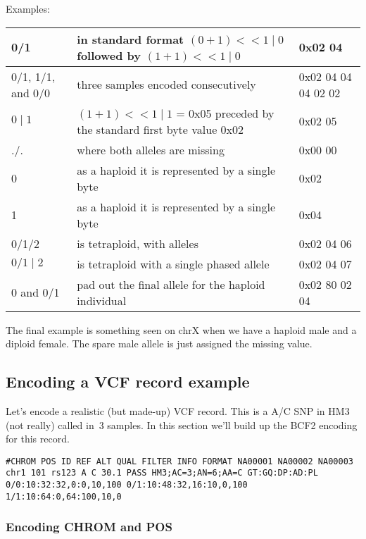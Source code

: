 \documentclass[8pt]{article}
\begin{document}
Examples:

\vspace{0.3cm}
\small
\begin{tabular}{|p{2.5cm} | p{10cm} | p{3cm}|} \hline
0/1 & in standard format $(0 + 1) << 1 \mid 0$ followed by $(1 + 1) << 1 \mid 0$ & 0x02 04 \\ \hline
0/1, 1/1, and 0/0 & three samples encoded consecutively & 0x02 04 04 04 02 02 \\ \hline
$0\mid1$ & $(1 + 1) << 1 \mid 1$ = 0x05 preceded by the standard first byte value 0x02 & 0x02 05 \\ \hline
./. & where both alleles are missing & 0x00 00 \\ \hline
0 & as a haploid it is represented by a single byte & 0x02 \\ \hline
1 & as a haploid it is represented by a single byte & 0x04 \\ \hline
0/1/2 & is tetraploid, with alleles & 0x02 04 06 \\ \hline
$0/1\mid2$ & is tetraploid with a single phased allele & 0x02 04 07 \\ \hline
0 and 0/1 & pad out the final allele for the haploid individual & 0x02 80 02 04\\ \hline
\end{tabular}
\normalsize

\vspace{0.3cm}
The final example is something seen on chrX when we have a haploid male and a diploid female. The spare male allele is just assigned the missing value.
\vspace{0.3cm}



\subsection{Encoding a VCF record example}

Let's encode a realistic (but made-up) VCF record.  This is a A/C SNP in HM3
(not really) called in~3 samples.  In this section we'll build up the BCF2
encoding for this record.
\scriptsize
\begin{verbatim}
#CHROM POS ID REF ALT QUAL FILTER INFO FORMAT NA00001 NA00002 NA00003
chr1 101 rs123 A C 30.1 PASS HM3;AC=3;AN=6;AA=C GT:GQ:DP:AD:PL 0/0:10:32:32,0:0,10,100 0/1:10:48:32,16:10,0,100 1/1:10:64:0,64:100,10,0
\end{verbatim}
\normalsize

\subsubsection{Encoding CHROM and POS}
\end{document}
